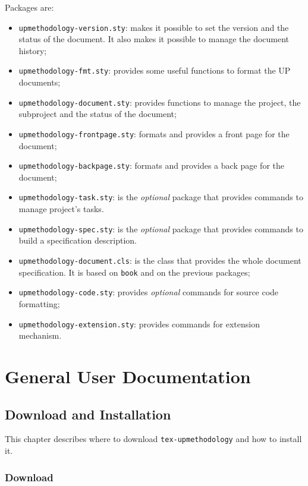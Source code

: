 \documentclass[book,taskpackage,specpackage,codepackage]{upmethodology-document}
\begin{document}
Packages are:
\begin{itemize}
\item \texttt{upmethodology-version.sty}: makes it possible to set the version and the status of the document. It also makes it possible to manage the document history;
\item \texttt{upmethodology-fmt.sty}: provides some useful functions to format the UP documents;
\item \texttt{upmethodology-document.sty}: provides functions to manage the project, the subproject and the status of the document;
\item \texttt{upmethodology-frontpage.sty}: formats and provides a front page for the document;
\item \texttt{upmethodology-backpage.sty}: formats and provides a back page for the document;
\item \texttt{upmethodology-task.sty}: is the \emph{optional} \LaTeXe\xspace package that provides commands to manage project's tasks.
\item \texttt{upmethodology-spec.sty}: is the \emph{optional} \LaTeXe\xspace package that provides commands to build a specification description.
\item \texttt{upmethodology-document.cls}: is the \LaTeXe\xspace class that provides the whole document specification. It is based on \texttt{book} and on the previous packages;
\item \texttt{upmethodology-code.sty}: provides \emph{optional} commands for source code formatting;
\item \texttt{upmethodology-extension.sty}: provides commands for extension mechanism.
\end{itemize}


\part{General User Documentation}

\chapter{Download and Installation}

This chapter describes where to download \texttt{tex-upmethodology} and how to install it.

\section{Download}
\end{document}
